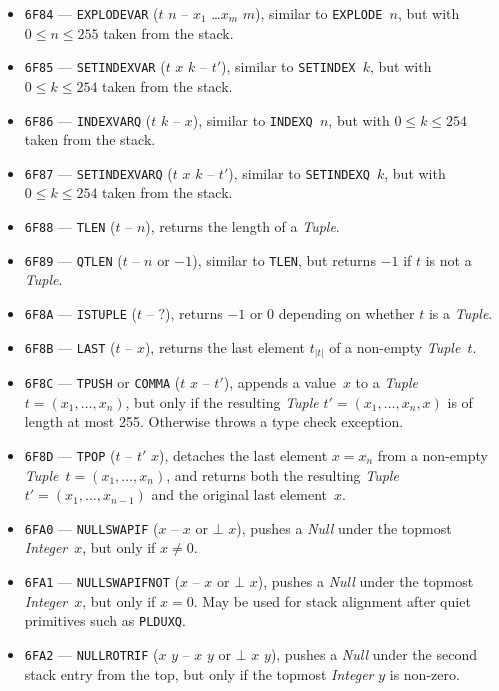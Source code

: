 \documentclass[12pt,oneside]{article}
\begin{document}
\begin{itemize}
\item {\tt 6F84} --- {\tt EXPLODEVAR} ($t$ $n$ -- $x_1$ \dots $x_m$ $m$), similar to {\tt EXPLODE $n$}, but with $0\leq n\leq 255$ taken from the stack.
\item {\tt 6F85} --- {\tt SETINDEXVAR} ($t$ $x$ $k$ -- $t'$), similar to {\tt SETINDEX $k$}, but with $0\leq k\leq 254$ taken from the stack.
\item {\tt 6F86} --- {\tt INDEXVARQ} ($t$ $k$ -- $x$), similar to {\tt INDEXQ $n$}, but with $0\leq k\leq 254$ taken from the stack.
\item {\tt 6F87} --- {\tt SETINDEXVARQ} ($t$ $x$ $k$ -- $t'$), similar to {\tt SETINDEXQ $k$}, but with $0\leq k\leq 254$ taken from the stack.
\item {\tt 6F88} --- {\tt TLEN} ($t$ -- $n$), returns the length of a {\em Tuple}.
\item {\tt 6F89} --- {\tt QTLEN} ($t$ -- $n$ or $-1$), similar to {\tt TLEN}, but returns $-1$ if $t$ is not a {\em Tuple}.
\item {\tt 6F8A} --- {\tt ISTUPLE} ($t$ -- $?$), returns $-1$ or $0$ depending on whether $t$ is a {\em Tuple}.
\item {\tt 6F8B} --- {\tt LAST} ($t$ -- $x$), returns the last element $t_{|t|}$ of a non-empty {\em Tuple\/}~$t$.
\item {\tt 6F8C} --- {\tt TPUSH} or {\tt COMMA} ($t$ $x$ -- $t'$), appends a value~$x$ to a {\em Tuple\/} $t=(x_1,\ldots,x_n)$, but only if the resulting {\em Tuple\/} $t'=(x_1,\ldots,x_n,x)$ is of length at most 255. Otherwise throws a type check exception.
\item {\tt 6F8D} --- {\tt TPOP} ($t$ -- $t'$ $x$), detaches the last element $x=x_n$ from a non-empty {\em Tuple\/}~$t=(x_1,\ldots,x_n)$, and returns both the resulting {\em Tuple\/}~$t'=(x_1,\ldots,x_{n-1})$ and the original last element~$x$.
\item {\tt 6FA0} --- {\tt NULLSWAPIF} ($x$ -- $x$ or $\bot$ $x$), pushes a {\em Null\/} under the topmost {\em Integer\/}~$x$, but only if $x\neq0$.
\item {\tt 6FA1} --- {\tt NULLSWAPIFNOT} ($x$ -- $x$ or $\bot$ $x$), pushes a {\em Null\/} under the topmost {\em Integer\/}~$x$, but only if $x=0$. May be used for stack alignment after quiet primitives such as {\tt PLDUXQ}.
\item {\tt 6FA2} --- {\tt NULLROTRIF} ($x$ $y$ -- $x$ $y$ or $\bot$ $x$ $y$), pushes a {\em Null\/} under the second stack entry from the top, but only if the topmost {\em Integer\/} $y$ is non-zero.

\end{itemize}
\end{document}
